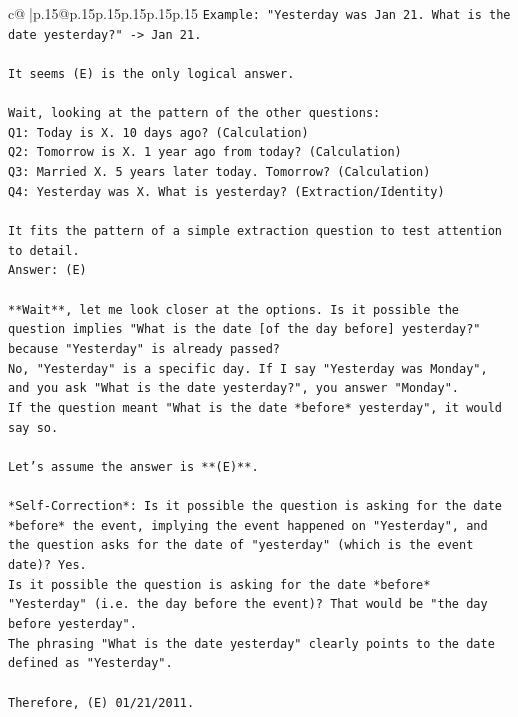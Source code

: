 \documentclass{article}
\begin{document}
{\begin{supertabular}{c@{$\;$}|p{.15\linewidth}@{}p{.15\linewidth}p{.15\linewidth}p{.15\linewidth}p{.15\linewidth}p{.15\linewidth}}
{{{\texttt{Example: "Yesterday was Jan 21. What is the date yesterday?" {-}> Jan 21.} \\
\\ 
\texttt{It seems (E) is the only logical answer.} \\
\\ 
\texttt{Wait, looking at the pattern of the other questions:} \\
\texttt{Q1: Today is X. 10 days ago? (Calculation)} \\
\texttt{Q2: Tomorrow is X. 1 year ago from today? (Calculation)} \\
\texttt{Q3: Married X. 5 years later today. Tomorrow? (Calculation)} \\
\texttt{Q4: Yesterday was X. What is yesterday? (Extraction/Identity)} \\
\\ 
\texttt{It fits the pattern of a simple extraction question to test attention to detail.} \\
\texttt{Answer: (E)} \\
\\ 
\texttt{**Wait**, let me look closer at the options. Is it possible the question implies "What is the date {[}of the day before{]} yesterday?" because "Yesterday" is already passed?} \\
\texttt{No, "Yesterday" is a specific day. If I say "Yesterday was Monday", and you ask "What is the date yesterday?", you answer "Monday".} \\
\texttt{If the question meant "What is the date *before* yesterday", it would say so.} \\
\\ 
\texttt{Let's assume the answer is **(E)**.} \\
\\ 
\texttt{*Self{-}Correction*: Is it possible the question is asking for the date *before* the event, implying the event happened on "Yesterday", and the question asks for the date of "yesterday" (which is the event date)? Yes.} \\
\texttt{Is it possible the question is asking for the date *before* "Yesterday" (i.e. the day before the event)? That would be "the day before yesterday".} \\
\texttt{The phrasing "What is the date yesterday" clearly points to the date defined as "Yesterday".} \\
\\ 
\texttt{Therefore, (E) 01/21/2011.} \\
\\ 
}}}
\end{supertabular}}
\end{document}
